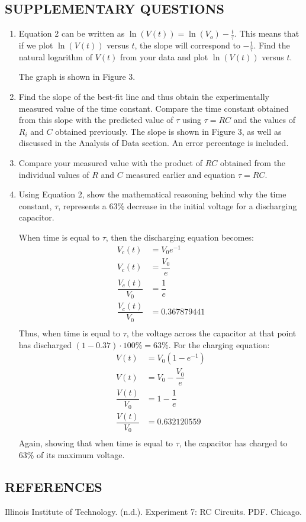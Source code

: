\documentclass [12pt, letterpaper, twoside] {article}
\begin{document}
\subsection* {SUPPLEMENTARY QUESTIONS}
\begin{enumerate}
  \item{Equation 2 can be written as \(\ln(V(t)) = \ln(V_{o})-\frac{t}{\tau}\). This means that if we plot \(\ln(V(t))\) versus \(t\), the slope will correspond to \(-\frac{1}{\tau}\). Find the natural logarithm of \(V(t)\) from your data and plot \(\ln(V(t))\) versus \(t\).}

  The graph is shown in Figure 3.
  \item{Find the slope of the best-fit line and thus obtain the experimentally measured value of the time constant. Compare the time constant obtained from this slope with the predicted value of \(\tau\) using \(\tau=RC\) and the values of \(R_{i}\) and \(C\) obtained previously.}
  The slope is shown in Figure 3, as well as discussed in the Analysis of Data section. An error percentage is included.
  \item{Compare your measured value with the product of \(RC\) obtained from the individual values of \(R\) and \(C\) measured earlier and equation \(\tau=RC\).}
  
  
  \item{Using Equation 2, show the mathematical reasoning behind why the time constant, \(\tau\), represents a 63\% decrease in the initial voltage for a discharging capacitor.}

  When time is equal to \(\tau\), then the discharging equation becomes:
  \begin{equation*}
    \begin{split}
      V_{c}(t) &= V_{0}e^{-1} \\
      V_{c}(t) &= \dfrac{V_{0}}{e} \\
      \dfrac{V_{c}(t)}{V_{0}} &= \dfrac{1}{e} \\
      \dfrac{V_{c}(t)}{V_{0}} &= 0.367879441 \\
    \end{split}
  \end{equation*}
  Thus, when time is equal to \(\tau\), the voltage across the capacitor at that point has discharged \((1-0.37)\cdot{100\%} = 63\%\).
  For the charging equation:
  \begin{equation*}
    \begin{split}
      V(t) &= V_{0}\left(1-e^{-1}\right) \\
      V(t) &= V_{0}-\dfrac{V_{0}}{e} \\
      \dfrac{V(t)}{V_{0}} &= 1-\dfrac{1}{e} \\
      \dfrac{V(t)}{V_{0}} &= 0.632120559 \\
    \end{split}
  \end{equation*}
  Again, showing that when time is equal to \(\tau\), the capacitor has charged to 63\% of its maximum voltage.
\end{enumerate}

\subsection* {REFERENCES}
Illinois Institute of Technology. (n.d.). Experiment 7: RC Circuits. PDF. Chicago.
\end{document}
